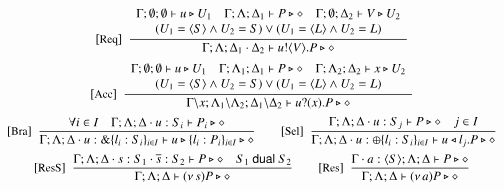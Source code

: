 \begin{figure}[t]
\[\begin{array}{c}
		\trule{Req}~~\tree{
			\begin{array}{c}
				\Gamma; \es; \es \proves u \hastype U_1
				\quad
				\Gamma; \Lambda; \Delta_1 \proves P \hastype \Proc
				\quad
				\Gamma; \es; \Delta_2 \proves V \hastype U_2
				\\
				(U_1 = \chtype{S} 
                                \land %
                                U_2 = S)
				\lor
				 (U_1 = \chtype{L} 
                                \land %
                                 U_2 = L)
			\end{array}
		}{
			\Gamma; \Lambda; \Delta_1 \cat \Delta_2 \proves \bout{u}{V} P \hastype \Proc
		}
		\\[4mm]

		\trule{Acc}~~\tree{
			\begin{array}{c}
				\Gamma; \emptyset; \emptyset \proves u \hastype U_1 
				\quad
				\Gamma; \Lambda_1; \Delta_1 \proves P \hastype \Proc
				\quad
				\Gamma; \Lambda_2; \Delta_2 \proves x \hastype U_2\\
				(U_1 = \chtype{S} 
                                \land %
                                U_2 = S)
				\lor
				 (U_1 = \chtype{L} 
                                \land %
                                 U_2 = L)
	               \end{array}
		}{
			\Gamma\backslash x; \Lambda_1 \backslash \Lambda_2; \Delta_1 \backslash \Delta_2 \proves \binp{u}{x} P \hastype \Proc
		}
		\\[4mm]

		\trule{Bra}~~\tree{
			 \forall i \in I \quad \Gamma; \Lambda; \Delta \cat u:S_i \proves P_i \hastype \Proc
		}{
			\Gamma; \Lambda; \Delta \cat u: \btbra{l_i:S_i}_{i \in I} \proves \bbra{u}{l_i:P_i}_{i \in I}\hastype \Proc
		}
		\qquad
	 	\trule{Sel}~~\tree{
			\Gamma; \Lambda; \Delta \cat u: S_j  \proves P \hastype \Proc \quad j \in I

		}{
			\Gamma; \Lambda; \Delta \cat u:\btsel{l_i:S_i}_{i \in I} \proves \bsel{u}{l_j} P \hastype \Proc
		}
		\\[4mm]

		\trule{ResS}~~\tree{
			\Gamma; \Lambda; \Delta \cat s:S_1 \cat \dual{s}: S_2 \proves P \hastype \Proc \quad S_1 \dualof S_2
		}{
			\Gamma; \Lambda; \Delta \proves \news{s} P \hastype \Proc
		}
		\qquad
		\trule{Res}~~\tree{
			\Gamma\cat a:\chtype{S} ; \Lambda; \Delta \proves P \hastype \Proc
		}{
			\Gamma; \Lambda; \Delta \proves \news{a} P \hastype \Proc
		}
		\\[4mm]
 

\end{array}\]
\end{figure}
